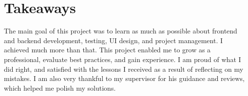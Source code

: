 \section{Takeaways}\label{sec:takeaways}

The main goal of this project
was to learn as much as possible about
frontend and backend development,
testing,
\ac{UI} design, and
project management.
I achieved much more than that.
This project enabled me to grow as a professional,
evaluate best practices,
and gain experience.
I am proud of what I did right,
and satisfied with the lessons
I received as a result of reflecting on my mistakes.
I am also very thankful to my supervisor
for his guidance and reviews,
which helped me polish my solutions.




